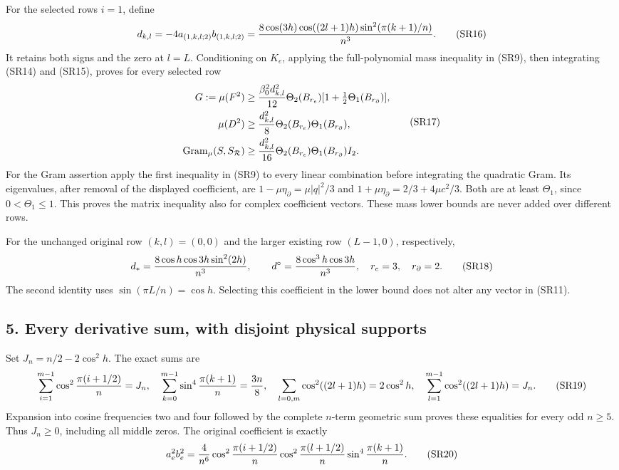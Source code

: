 \documentclass[11pt]{article}
\begin{document}
For the selected rows \(i=1\), define
\[
d_{k,l}=-4a_{(1,k,l;2)}b_{(1,k,l;2)}
={8\cos(3h)\cos((2l+1)h)\sin^2(\pi(k+1)/n)\over n^3}.
\tag{SR16}
\]
It retains both signs and the zero at \(l=L\). Conditioning on \(K_e\), applying the full-polynomial mass inequality in (SR9), then integrating (SR14) and (SR15), proves for every selected row
\[
\begin{aligned}
G:=\mu(F^2)&\ge {\beta_0^2d_{k,l}^2\over12}
\Theta_2(B_{r_e})[1+\tfrac12\Theta_1(B_{r_\partial})],\\
\mu(D^2)&\ge {d_{k,l}^2\over8}\Theta_2(B_{r_e})\Theta_1(B_{r_\partial}),\\
\operatorname{Gram}_\mu(S,S_{\mathcal R})
&\ge {d_{k,l}^2\over16}\Theta_2(B_{r_e})\Theta_1(B_{r_\partial})I_2.
\end{aligned}\tag{SR17}
\]
For the Gram assertion apply the first inequality in (SR9) to every linear combination before integrating the quadratic Gram. Its eigenvalues, after removal of the displayed coefficient, are \(1-\mu\eta_\partial=\mu|q|^2/3\) and \(1+\mu\eta_\partial=2/3+4\mu c^2/3\). Both are at least \(\Theta_1\), since \(0<\Theta_1\le1\). This proves the matrix inequality also for complex coefficient vectors. These mass lower bounds are never added over different rows.

For the unchanged original row \((k,l)=(0,0)\) and the larger existing row \((L-1,0)\), respectively,
\[
d_*={8\cos h\cos3h\sin^2(2h)\over n^3},\qquad
d^\circ={8\cos^3h\cos3h\over n^3},\quad
r_e=3,\quad r_\partial=2.
\tag{SR18}
\]
The second identity uses \(\sin(\pi L/n)=\cos h\). Selecting this coefficient in the lower bound does not alter any vector in (SR11).

\subsection*{5. Every derivative sum, with disjoint physical supports}

Set \(J_n=n/2-2\cos^2h\). The exact sums are
\[
\sum_{i=1}^{m-1}\cos^2{\pi(i+1/2)\over n}=J_n,\quad
\sum_{k=0}^{m-1}\sin^4{\pi(k+1)\over n}={3n\over8},\quad
\sum_{l=0,m}\cos^2((2l+1)h)=2\cos^2h,\quad
\sum_{l=1}^{m-1}\cos^2((2l+1)h)=J_n.
\tag{SR19}
\]
Expansion into cosine frequencies two and four followed by the complete \(n\)-term geometric sum proves these equalities for every odd \(n\ge5\). Thus \(J_n\ge0\), including all middle zeros. The original coefficient is exactly
\[
a_e^2b_e^2={4\over n^6}\cos^2{\pi(i+1/2)\over n}
\cos^2{\pi(l+1/2)\over n}\sin^4{\pi(k+1)\over n}.
\tag{SR20}
\]
\end{document}
